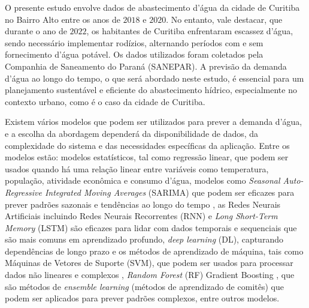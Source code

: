 O presente estudo envolve dados de abastecimento d'água da cidade de Curitiba no Bairro Alto entre os anos de $2018$ e $2020$. No entanto, vale destacar, que durante o ano de $2022$, os habitantes de Curitiba enfrentaram escassez d'água, sendo necessário implementar rodízios, alternando períodos com e sem fornecimento d'água potável. Os dados utilizados foram coletados pela Companhia de Saneamento do Paraná (SANEPAR). A previsão da demanda d'água ao longo do tempo, o que será abordado neste estudo, é essencial para um planejamento sustentável e eficiente do abastecimento hídrico, especialmente no contexto urbano, como é o caso da cidade de Curitiba. 

Existem vários modelos que podem ser utilizados para prever a demanda d'água, e a escolha da abordagem dependerá da disponibilidade de dados, da complexidade do sistema e das necessidades específicas da aplicação. Entre os modelos estão: modelos estatísticos, tal como regressão linear, que podem ser usados quando há uma relação linear entre variáveis como temperatura, população, atividade econômica e consumo d'água, modelos como \textit{Seasonal Auto-Regressive Integrated Moving Averages} (SARIMA) que podem ser eficazes para prever padrões sazonais e tendências ao longo do tempo \cite{OLIVEIRA2017177}, as Redes Neurais Artificiais incluindo Redes Neurais Recorrentes (RNN) \cite{ASEERI2023101984} e \textit{Long Short-Term Memory} (LSTM) \cite{SABZIPOUR2023130380} são eficazes para lidar com dados temporais e sequenciais que são mais comuns em aprendizado profundo, \textit{deep learning} (DL), capturando dependências de longo prazo e os métodos de aprendizado de máquina, tais como Máquinas de Vetores de Suporte (SVM), que podem ser usados para processar dados não lineares e complexos \cite{CANDELIERI2019202}, \textit{Random Forest} (RF) \cite{ALI2023731} Gradient Boosting \cite{DONG2023105579}, que são métodos de \textit{ensemble learning} (métodos de aprendizado de comitês) que podem ser aplicados para prever padrões complexos, entre outros modelos.


